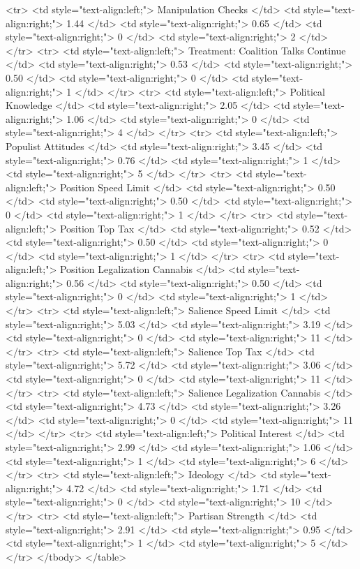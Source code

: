   <tr>
   <td style="text-align:left;"> Manipulation Checks </td>
   <td style="text-align:right;"> 1.44 </td>
   <td style="text-align:right;"> 0.65 </td>
   <td style="text-align:right;"> 0 </td>
   <td style="text-align:right;"> 2 </td>
  </tr>
  <tr>
   <td style="text-align:left;"> Treatment: Coalition Talks Continue </td>
   <td style="text-align:right;"> 0.53 </td>
   <td style="text-align:right;"> 0.50 </td>
   <td style="text-align:right;"> 0 </td>
   <td style="text-align:right;"> 1 </td>
  </tr>
  <tr>
   <td style="text-align:left;"> Political Knowledge </td>
   <td style="text-align:right;"> 2.05 </td>
   <td style="text-align:right;"> 1.06 </td>
   <td style="text-align:right;"> 0 </td>
   <td style="text-align:right;"> 4 </td>
  </tr>
  <tr>
   <td style="text-align:left;"> Populist Attitudes </td>
   <td style="text-align:right;"> 3.45 </td>
   <td style="text-align:right;"> 0.76 </td>
   <td style="text-align:right;"> 1 </td>
   <td style="text-align:right;"> 5 </td>
  </tr>
  <tr>
   <td style="text-align:left;"> Position Speed Limit </td>
   <td style="text-align:right;"> 0.50 </td>
   <td style="text-align:right;"> 0.50 </td>
   <td style="text-align:right;"> 0 </td>
   <td style="text-align:right;"> 1 </td>
  </tr>
  <tr>
   <td style="text-align:left;"> Position Top Tax </td>
   <td style="text-align:right;"> 0.52 </td>
   <td style="text-align:right;"> 0.50 </td>
   <td style="text-align:right;"> 0 </td>
   <td style="text-align:right;"> 1 </td>
  </tr>
  <tr>
   <td style="text-align:left;"> Position Legalization Cannabis </td>
   <td style="text-align:right;"> 0.56 </td>
   <td style="text-align:right;"> 0.50 </td>
   <td style="text-align:right;"> 0 </td>
   <td style="text-align:right;"> 1 </td>
  </tr>
  <tr>
   <td style="text-align:left;"> Salience Speed Limit </td>
   <td style="text-align:right;"> 5.03 </td>
   <td style="text-align:right;"> 3.19 </td>
   <td style="text-align:right;"> 0 </td>
   <td style="text-align:right;"> 11 </td>
  </tr>
  <tr>
   <td style="text-align:left;"> Salience Top Tax </td>
   <td style="text-align:right;"> 5.72 </td>
   <td style="text-align:right;"> 3.06 </td>
   <td style="text-align:right;"> 0 </td>
   <td style="text-align:right;"> 11 </td>
  </tr>
  <tr>
   <td style="text-align:left;"> Salience Legalization Cannabis </td>
   <td style="text-align:right;"> 4.73 </td>
   <td style="text-align:right;"> 3.26 </td>
   <td style="text-align:right;"> 0 </td>
   <td style="text-align:right;"> 11 </td>
  </tr>
  <tr>
   <td style="text-align:left;"> Political Interest </td>
   <td style="text-align:right;"> 2.99 </td>
   <td style="text-align:right;"> 1.06 </td>
   <td style="text-align:right;"> 1 </td>
   <td style="text-align:right;"> 6 </td>
  </tr>
  <tr>
   <td style="text-align:left;"> Ideology </td>
   <td style="text-align:right;"> 4.72 </td>
   <td style="text-align:right;"> 1.71 </td>
   <td style="text-align:right;"> 0 </td>
   <td style="text-align:right;"> 10 </td>
  </tr>
  <tr>
   <td style="text-align:left;"> Partisan Strength </td>
   <td style="text-align:right;"> 2.91 </td>
   <td style="text-align:right;"> 0.95 </td>
   <td style="text-align:right;"> 1 </td>
   <td style="text-align:right;"> 5 </td>
  </tr>
</tbody>
</table>
